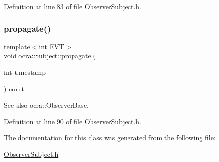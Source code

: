 Definition at line 83 of file Observer\+Subject.\+h.

\hypertarget{classocra_1_1Subject_aa5198dd8ca9dcb16105f6b53ffefbfca}{}\label{classocra_1_1Subject_aa5198dd8ca9dcb16105f6b53ffefbfca} 
\subsubsection{\texorpdfstring{propagate()}{propagate()}\hspace{0.1cm}{\footnotesize\ttfamily [2/2]}}
{\footnotesize\ttfamily template$<$int E\+VT$>$ \\
void ocra\+::\+Subject\+::propagate (\begin{DoxyParamCaption}\item[{int}]{timestamp }\end{DoxyParamCaption}) const\hspace{0.3cm}{\ttfamily [inline]}}

\begin{DoxySeeAlso}{See also}
\hyperlink{classocra_1_1ObserverBase}{ocra\+::\+Observer\+Base}. 
\end{DoxySeeAlso}


Definition at line 90 of file Observer\+Subject.\+h.



The documentation for this class was generated from the following file\+:\begin{DoxyCompactItemize}
\item 
\hyperlink{ObserverSubject_8h}{Observer\+Subject.\+h}\end{DoxyCompactItemize}
